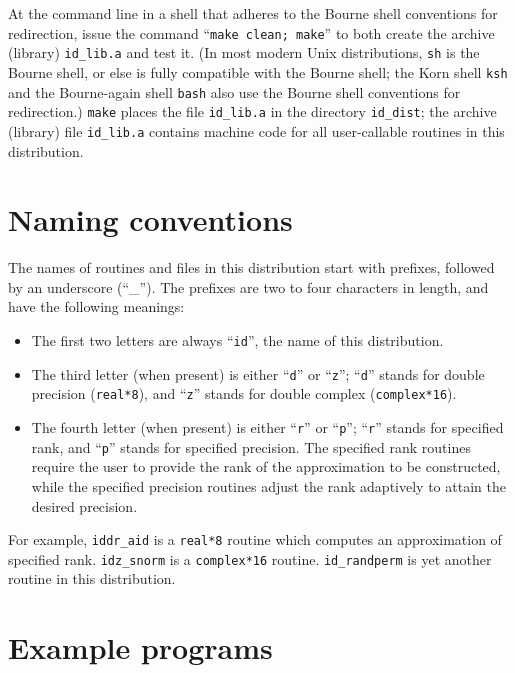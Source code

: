 ﻿\documentclass[letterpaper,12pt]{article}
\begin{document}
At the command line in a shell that adheres
to the Bourne shell conventions for redirection, issue the command
``{\tt make clean; make}'' to both create the archive (library)
{\tt id\_lib.a} and test it.
(In most modern Unix distributions, {\tt sh} is the Bourne shell,
or else is fully compatible with the Bourne shell;
the Korn shell {\tt ksh} and the Bourne-again shell {\tt bash}
also use the Bourne shell conventions for redirection.)
{\tt make} places the file {\tt id\_lib.a}
in the directory {\tt id\_dist}; the archive (library) file
{\tt id\_lib.a} contains machine code for all user-callable routines
in this distribution.



\section{Naming conventions}
\label{naming}

The names of routines and files in this distribution
start with prefixes, followed by an underscore (``\_'').
The prefixes are two to four characters in length,
and have the following meanings:
%
\begin{itemize}
\item The first two letters are always ``{\tt id}'',
      the name of this distribution.
\item The third letter (when present) is either ``{\tt d}''
      or ``{\tt z}'';
      ``{\tt d}'' stands for double precision ({\tt real*8}),
      and ``{\tt z}'' stands for double complex ({\tt complex*16}).
\item The fourth letter (when present) is either ``{\tt r}''
      or ``{\tt p}'';
      ``{\tt r}'' stands for specified rank,
      and ``{\tt p}'' stands for specified precision.
      The specified rank routines require the user to provide
      the rank of the approximation to be constructed,
      while the specified precision routines adjust the rank adaptively
      to attain the desired precision.
\end{itemize}

For example, {\tt iddr\_aid} is a {\tt real*8} routine which computes
an approximation of specified rank.
{\tt idz\_snorm} is a {\tt complex*16} routine.
{\tt id\_randperm} is yet another routine in this distribution.



\section{Example programs}
\end{document}

